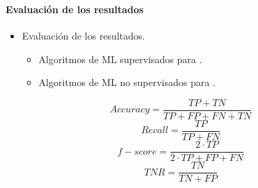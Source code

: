 \begin{frame}
\frametitle{\secname} %
\framesubtitle{Evaluación de los resultados} %
\rmfamily %
\color{black} %
\begin{itemize}
    \item Evaluación de los resultados.
        \begin{itemize}
            \item Algoritmos de ML supervisados para .
            \item Algoritmos de ML no supervisados para .
        \end{itemize}
\end{itemize}
{\small
\begin{multicols}{2}
\begin{equation*}
    Accuracy = \frac{TP + TN}{TP + FP + FN + TN}
\end{equation*}
\begin{equation*}
    Recall = \frac{TP}{TP + FN}
\end{equation*}
\begin{equation*}
    f-score = \frac{2 \cdot TP}{2 \cdot TP + FP + FN}
\end{equation*}
\begin{equation*}
    TNR = \frac{TN}{TN + FP}
\end{equation*}
\end{multicols}
}
\end{frame}





